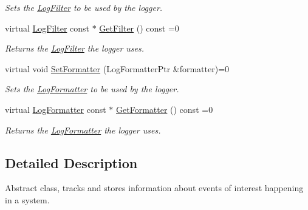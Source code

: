 \begin{DoxyCompactItemize}
\begin{DoxyCompactList}\small\item\em Sets the \hyperlink{class_common_1_1_log_filter}{Log\-Filter} to be used by the logger. \end{DoxyCompactList}\item 
\hypertarget{class_common_1_1_logger_a79e05daf2a2bf89829e3fb0876b2d335}{virtual \hyperlink{class_common_1_1_log_filter}{Log\-Filter} const $\ast$ \hyperlink{class_common_1_1_logger_a79e05daf2a2bf89829e3fb0876b2d335}{Get\-Filter} () const =0}\label{class_common_1_1_logger_a79e05daf2a2bf89829e3fb0876b2d335}

\begin{DoxyCompactList}\small\item\em Returns the \hyperlink{class_common_1_1_log_filter}{Log\-Filter} the logger uses. \end{DoxyCompactList}\item 
\hypertarget{class_common_1_1_logger_a9ac47b3569eac45a0cbb877339c702c2}{virtual void \hyperlink{class_common_1_1_logger_a9ac47b3569eac45a0cbb877339c702c2}{Set\-Formatter} (Log\-Formatter\-Ptr \&formatter)=0}\label{class_common_1_1_logger_a9ac47b3569eac45a0cbb877339c702c2}

\begin{DoxyCompactList}\small\item\em Sets the \hyperlink{class_common_1_1_log_formatter}{Log\-Formatter} to be used by the logger. \end{DoxyCompactList}\item 
\hypertarget{class_common_1_1_logger_a5e97af073499220bd7137531670fe3a4}{virtual \hyperlink{class_common_1_1_log_formatter}{Log\-Formatter} const $\ast$ \hyperlink{class_common_1_1_logger_a5e97af073499220bd7137531670fe3a4}{Get\-Formatter} () const =0}\label{class_common_1_1_logger_a5e97af073499220bd7137531670fe3a4}

\begin{DoxyCompactList}\small\item\em Returns the \hyperlink{class_common_1_1_log_formatter}{Log\-Formatter} the logger uses. \end{DoxyCompactList}\end{DoxyCompactItemize}


\subsection{Detailed Description}
Abstract class, tracks and stores information about events of interest happening in a system. 


